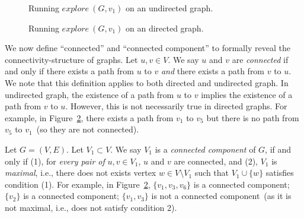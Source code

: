 \begin{minipage}{0.8\textwidth}
	\xxx
	\xxx
	\xxx
	\xxx
	\xxx
	\xxx
\end{minipage}



\begin{figure}[h!]
\centering{}
\caption{Running $explore~(G, v_1)$ on an undirected graph.}
\label{fig:explore-undirected}
\end{figure}

\begin{figure}[h!]
\centering{}
\caption{Running $explore~(G, v_1)$ on an directed graph.}
\label{fig:explore-directed}
\end{figure}

We now define ``connected'' and ``connected component'' to formally reveal the connectivity-structure of graphs.
Let $u,v\in V$. We say $u$ and $v$ are \emph{connected} if and only if there exists a path from $u$ to $v$
\emph{and} there exists a path from $v$ to $u$. 
We note that this definition applies to both directed and undirected graph.
In undirected graph, the existence of a path from $u$ to $v$ implies the
existence of a path from $v$ to $u$. However, this is not necessarily true in directed
graphs. For example, in Figure~\ref{fig:explore-directed}, there exists a path from $v_1$ to $v_5$ but there is no path
from $v_5$ to $v_1$~(so they are not connected).

Let $G = (V, E)$. Let $V_1\subset V$. We say $V_1$ is a \emph{connected component} of $G$,
if and only if (1), for \emph{every pair of} $u,v\in V_1$, $u$ and $v$ are connected,
and (2), $V_1$ is \emph{maximal}, i.e., there does not exists vertex $w\in V\setminus V_1$ such
that $V_1\cup \{w\}$ satisfies condition (1).
For example, in Figure~\ref{fig:explore-directed}, $\{v_1, v_3, v_6\}$ is a connected component;
$\{v_2\}$ is a connected component; 
$\{v_1, v_3\}$ is not a connected component~(as it is not maximal, i.e., does not satisfy condition 2). 

